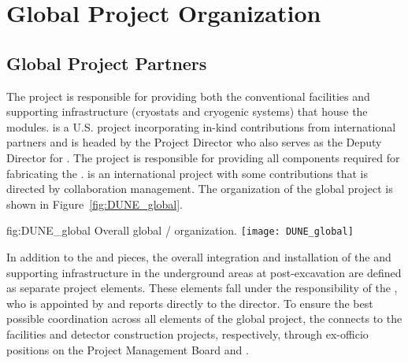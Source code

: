 \chapter{Global Project Organization}
\label{vl:tc-global}

\section{Global Project Partners}
\label{sec:partners}

The  project is responsible for providing both the conventional
facilities and supporting infrastructure (cryostats and cryogenic
systems) that house the   modules.  is a
U.S.  project incorporating in-kind contributions from
international partners and is headed by the  Project Director who
also serves as the  Deputy Director for .  The 
project is responsible for providing all components required for
fabricating the .  is an international project
with some  contributions that is directed by 
collaboration management. The organization of the global project 
is shown in Figure~\ref{fig:DUNE_global}.
\begin{dunefigure}{fig:DUNE_global}
  {Overall global  / organization.}
  \texttt{[image: DUNE\_global]}
\end{dunefigure}

In addition to the  and  pieces, the overall
integration and installation of the  and supporting
 infrastructure in the underground areas at 
post-excavation are defined as separate project elements.  These
elements fall under the responsibility of the , who is
appointed by and reports directly to the  director.  To ensure
the best possible coordination across all elements of the global
project, the  connects to the facilities and detector
construction projects, respectively, through ex-officio positions on
the  Project Management Board and 
.

